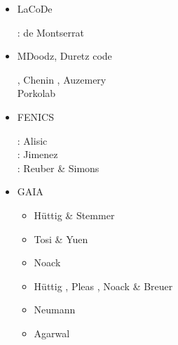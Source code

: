 \begin{itemize}
\cite{maierova}
\cite{mals14}

\item {\codefont LaCoDe}  

\begin{scriptsize}
\noindent
\twothousandnineteen: de Montserrat \etal \cite{demh19}
\end{scriptsize}

\item {\codefont MDoodz}, Duretz code

\begin{scriptsize}
\cite{yatd12}
\cite{yahb13}
\cite{yadm15}
\cite{dumy16}\cite{dupm16}
\cite{chmd19}\cite{dual19}\cite{pedm19}
\cite{poyd20}\cite{bedh20}, Chenin \etal \cite{chsm20}, Auzemery \etal \cite{auwy20}\\
\twothousandtwentyone Porkolab \etal \cite{pody21}
\end{scriptsize}

\item {\codefont FENICS} 

\begin{scriptsize}
\noindent
\twothousandfourteen: Alisic \etal \cite{alrk14}\\
\twothousandseventeen: Jimenez \etal \cite{jidb17}\\
\twothousandtwenty: Reuber \& Simons \cite{resi20}
\end{scriptsize}


\item {\codefont GAIA} 

\begin{scriptsize}
\begin{itemize}
\item[\twothousandeight] H{\"u}ttig \& Stemmer \cite{hust08b} 
\item[\twothousandeleven] Tosi \& Yuen \cite{toyu11} 
\item[\twothousandtwelve] Noack \etal \cite{nobs12}
\item[\twothousandthirteen] H{\"u}ttig \etal \cite{hutm13}, Pleas \etal \cite{plth13}, 
                            Noack \& Breuer \cite{nobr13} 
\item[\twothousandnineteen] Neumann \cite{neum19}
\item[\twothousandtwenty] Agarwal \etal \cite{agtb20}
\end{itemize}
\end{scriptsize}


\end{itemize}
